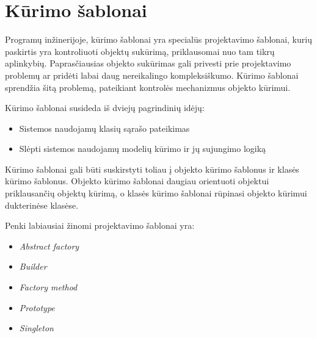 \documentclass[10pt]{IEEEtran}
\begin{document}
	\section{Kūrimo šablonai}

		Programų inžinerijoje, kūrimo šablonai yra specialūs projektavimo šablonai, kurių paskirtis yra kontroliuoti objektų sukūrimą, priklausomai nuo tam tikrų aplinkybių. Paprasčiausias objekto sukūrimas gali privesti prie projektavimo problemų ar pridėti labai daug nereikalingo kompleksiškumo. Kūrimo šablonai sprendžia šitą problemą, pateikiant kontrolės mechanizmus objekto kūrimui.

		Kūrimo šablonai susideda iš dviejų pagrindinių idėjų:
		\begin{itemize}
			\item Sistemos naudojamų klasių sąrašo pateikimas
			\item Slėpti sistemos naudojamų modelių kūrimo ir jų sujungimo logiką 
		\end{itemize}

		Kūrimo šablonai gali būti suskirstyti toliau į objekto kūrimo šablonus ir klasės kūrimo šablonus. Objekto kūrimo šablonai daugiau orientuoti objektui priklausančių objektų kūrimą, o klasės kūrimo šablonai rūpinasi objekto kūrimui dukterinėse klasėse.

		Penki labiausiai žinomi projektavimo šablonai yra:

		\begin{itemize}
			\item \textit{Abstract factory}
			\item \textit{Builder}
			\item \textit{Factory method}
			\item \textit{Prototype}
			\item \textit{Singleton}
		\end{itemize}

		
\end{document}
